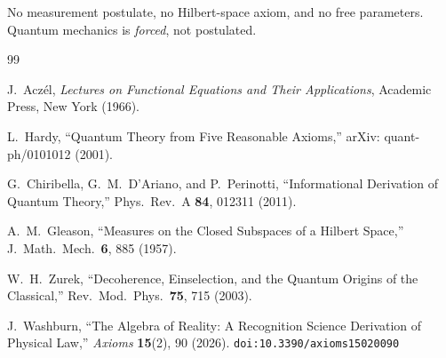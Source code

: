 \documentclass[12pt,a4paper]{article}
\theoremstyle{definition}
\theoremstyle{remark}
\begin{document}
No measurement postulate, no Hilbert-space axiom, and no free
parameters.  Quantum mechanics is \emph{forced}, not postulated.

\begin{thebibliography}{99}

J.~Acz\'el, \emph{Lectures on Functional Equations and Their Applications},
Academic Press, New York (1966).

L.~Hardy, ``Quantum Theory from Five Reasonable Axioms,'' arXiv:
quant-ph/0101012 (2001).

G.~Chiribella, G.~M.~D'Ariano, and P.~Perinotti, ``Informational
Derivation of Quantum Theory,'' Phys.\ Rev.\ A \textbf{84}, 012311
(2011).

A.~M.~Gleason, ``Measures on the Closed Subspaces of a Hilbert
Space,'' J.\ Math.\ Mech.\ \textbf{6}, 885 (1957).

W.~H.~Zurek, ``Decoherence, Einselection, and the Quantum Origins
of the Classical,'' Rev.\ Mod.\ Phys.\ \textbf{75}, 715 (2003).

J.~Washburn, ``The Algebra of Reality: A Recognition Science Derivation
of Physical Law,'' \emph{Axioms} \textbf{15}(2), 90 (2026).
\texttt{doi:10.3390/axioms15020090}

\end{thebibliography}
\end{document}

